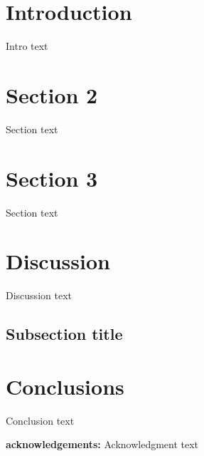 \section{Introduction}

Intro text \citep{Dawson:2012dl}

\section{Section 2}

Section text \citet{Bradac:2008gw}

\section{Section 3}

Section text

\section{Discussion}

Discussion text

\subsection{Subsection title}

\section{Conclusions}

Conclusion text

\textbf{acknowledgements:}
Acknowledgment text

%



%
%  
